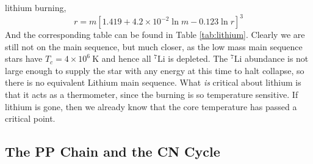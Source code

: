 \documentclass[10pt]{article}
\numberwithin{equation}{section}
\begin{document}
  lithium burning,
  \begin{equation}
    \label{eq:403}
    r=m\left[1.419+4.2\times 10^{-2}\ln m-0.123 \ln r\right]^3
  \end{equation}
  And the corresponding table can be found in Table
  \ref{tab:lithium}. Clearly we are still not on the main sequence,
  but much closer, as the low mass main sequence stars have
  $T_c=4\times 10^6\ \mathrm{K}$ and hence all ${}^7\mathrm{Li}$ is
  depleted. The ${}^7\mathrm{Li}$ abundance is not large enough to
  supply the star with any energy  at this time to halt collapse, so
  there is no equivalent Lithium main sequence. What \emph{is}
  critical about lithium is that it acts as a thermometer, since the
  burning is so temperature sensitive. If lithium is gone, then we
  already know that the core temperature has passed a critical point.
  
  \subsection{The PP Chain and the CN Cycle}
  \label{sec:pp-chain}
\end{document}
